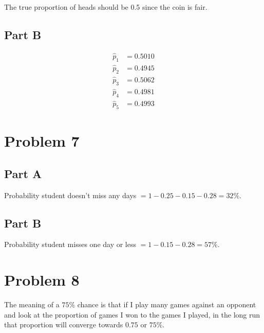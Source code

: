 \documentclass[12pt]{extarticle}
\begin{document}
The true proportion of heads should be 0.5 since the coin is fair.

\subsection*{Part B}

\begin{align*}
	\hat{p}_1 &= 0.5010  \\
	\hat{p}_2 &= 0.4945 \\
	\hat{p}_3 &= 0.5062 \\
	\hat{p}_4 &= 0.4981 \\
	\hat{p}_5 &= 0.4993
\end{align*}

\section*{Problem 7}
\subsection*{Part A}

Probability student doesn't miss any days $= 1 - 0.25 - 0.15 - 0.28 = 32\%$.

\subsection*{Part B}
Probability student misses one day or less $= 1 - 0.15 - 0.28 = 57\%$.

\section*{Problem 8}
The meaning of a $75\%$ chance is that if I play many games against an opponent and look at the proportion of games I won to the games I played, in the long run that proportion will converge towards $0.75$ or $75\%$.
\end{document}
